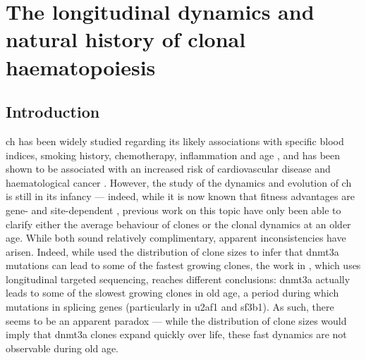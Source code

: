 \chapter{The longitudinal dynamics and natural history of clonal haematopoiesis}

\section{Introduction}

\ac{ch} has been widely studied regarding its likely associations with specific blood indices, smoking history, chemotherapy, inflammation and age \cite{Dawoud2020-af,Coombs2017-ph,McKerrell2015-rl,Cai2018-yi,Bolton2020-ct}, and has been shown to be associated with an increased risk of cardiovascular disease and haematological cancer \cite{Jaiswal2014-rl,Genovese2014-eu, Young2016-du, Xie2014-np, Desai2018-pj, Midic2020-zh, Zink2017-zi, Acuna-Hidalgo2017-ng}. However, the study of the dynamics and evolution of \ac{ch} is still in its infancy --- indeed, while it is now known that fitness advantages are gene- and site-dependent \cite{Watson2020-pz,Robertson2021-sw}, previous work on this topic have only been able to clarify either the average behaviour of clones or the clonal dynamics at an older age. While both sound relatively complimentary, apparent inconsistencies have arisen. Indeed, while \cite{Watson2020-pz} used the distribution of clone sizes to infer that \ac{dnmt3a} mutations can lead to some of the fastest growing clones, the work in \cite{Robertson2021-sw}, which uses longitudinal targeted sequencing, reaches different conclusions: \ac{dnmt3a} actually leads to some of the slowest growing clones in old age, a period during which mutations in splicing genes (particularly in \ac{u2af1} and \ac{sf3b1}). As such, there seems to be an apparent paradox --- while the distribution of clone sizes would imply that \ac{dnmt3a} clones expand quickly over life, these fast dynamics are not observable during old age. 

